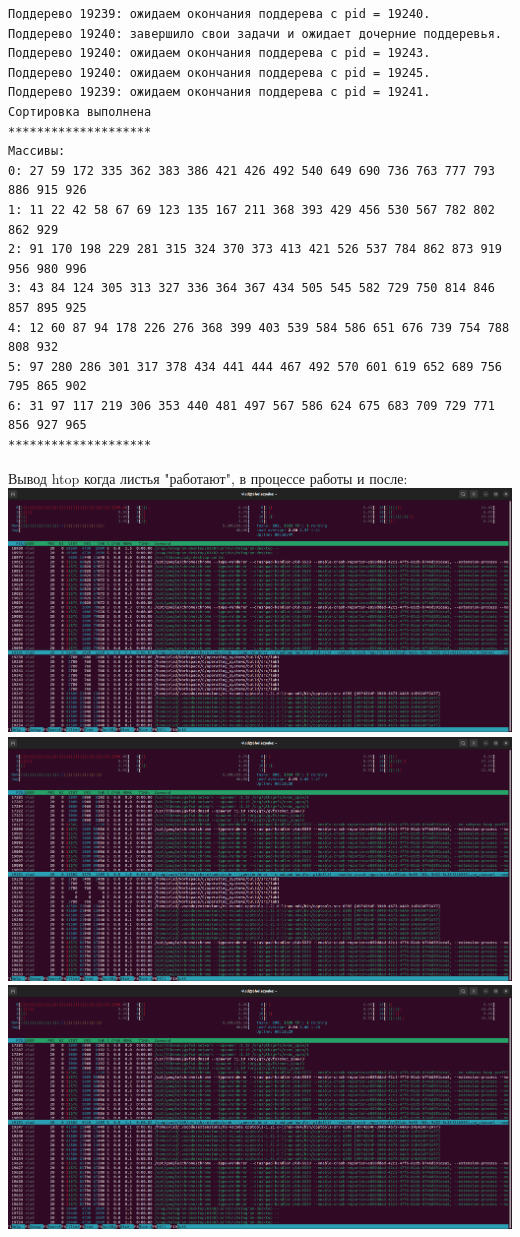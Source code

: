 \documentclass[a4paper,14pt]{extarticle}
\begin{document}
\begin{verbatim}
Поддерево 19239: ожидаем окончания поддерева с pid = 19240.
Поддерево 19240: завершило свои задачи и ожидает дочерние поддеревья.
Поддерево 19240: ожидаем окончания поддерева с pid = 19243.
Поддерево 19240: ожидаем окончания поддерева с pid = 19245.
Поддерево 19239: ожидаем окончания поддерева с pid = 19241.
Сортировка выполнена
********************
Массивы:
0: 27 59 172 335 362 383 386 421 426 492 540 649 690 736 763 777 793 886 915 926 
1: 11 22 42 58 67 69 123 135 167 211 368 393 429 456 530 567 782 802 862 929 
2: 91 170 198 229 281 315 324 370 373 413 421 526 537 784 862 873 919 956 980 996 
3: 43 84 124 305 313 327 336 364 367 434 505 545 582 729 750 814 846 857 895 925 
4: 12 60 87 94 178 226 276 368 399 403 539 584 586 651 676 739 754 788 808 932 
5: 97 280 286 301 317 378 434 441 444 467 492 570 601 619 652 689 756 795 865 902 
6: 31 97 117 219 306 353 440 481 497 567 586 624 675 683 709 729 771 856 927 965 
********************
\end{verbatim}
Вывод htop когда листья "работают", в процессе работы и после:\\
\includegraphics[width=140mm]{main_htop_before}\\
\includegraphics[width=140mm]{main_htop_mid}\\
\includegraphics[width=140mm]{main_htop_after}\\
\end{document}
